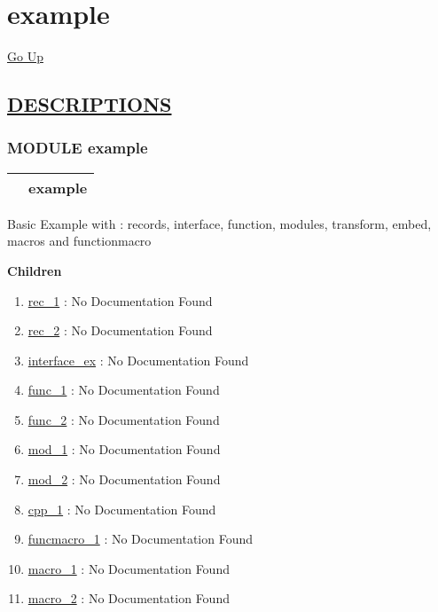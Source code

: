 \chapter*{\color{headfile}
example
}
\hypertarget{ecldoc:toc:example}{}
\hyperlink{ecldoc:toc:root}{Go Up}


\section*{\underline{\textsf{DESCRIPTIONS}}}
\subsection*{\textsf{\colorbox{headtoc}{\color{white} MODULE}
example}}

\hypertarget{ecldoc:example}{}

{\renewcommand{\arraystretch}{1.5}
\begin{tabularx}{\textwidth}{|>{\raggedright\arraybackslash}l|X|}
\hline
\hspace{0pt}\mytexttt{\color{red} } & \textbf{example} \\
\hline
\end{tabularx}
}

\par





Basic Example with : records, interface, function, modules, transform, embed, macros and functionmacro







\textbf{Children}
\begin{enumerate}
\item \hyperlink{ecldoc:example.rec_1}{rec\_1}
: No Documentation Found
\item \hyperlink{ecldoc:example.rec_2}{rec\_2}
: No Documentation Found
\item \hyperlink{ecldoc:example.interface_ex}{interface\_ex}
: No Documentation Found
\item \hyperlink{ecldoc:example.func_1}{func\_1}
: No Documentation Found
\item \hyperlink{ecldoc:example.func_2}{func\_2}
: No Documentation Found
\item \hyperlink{ecldoc:example.mod_1}{mod\_1}
: No Documentation Found
\item \hyperlink{ecldoc:example.mod_2}{mod\_2}
: No Documentation Found
\item \hyperlink{ecldoc:example.cpp_1}{cpp\_1}
: No Documentation Found
\item \hyperlink{ecldoc:example.funcmacro_1}{funcmacro\_1}
: No Documentation Found
\item \hyperlink{ecldoc:example.macro_1}{macro\_1}
: No Documentation Found
\item \hyperlink{ecldoc:example.macro_2}{macro\_2}
: No Documentation Found
\end{enumerate}

